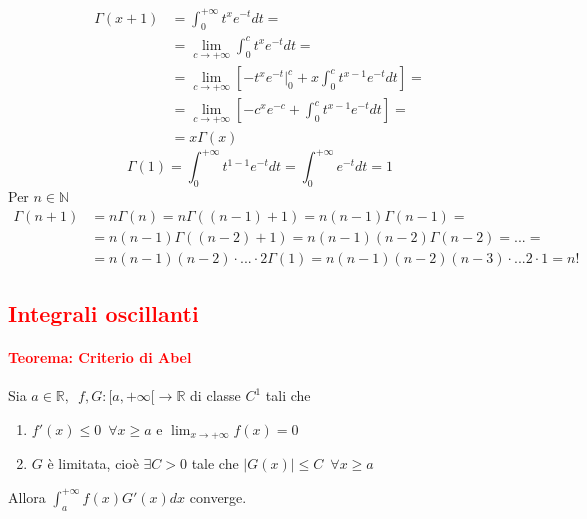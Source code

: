 \documentclass{article}
\newcommand{\R}{\mathbb{R}}
\newcommand{\N}{\mathbb{N}}
\begin{document}
\begin{enumerate}
\begin{align*}
        \Gamma(x+1)&=\int_{0}^{+\infty}t^{x}e^{-t}dt=\\
        &= \lim_{c\rightarrow+\infty} \int_{0}^{c}t^{x}e^{-t}dt=\\
        &= \lim_{c\rightarrow+\infty}\left[ -t^xe^{-t}|_{0}^c +x\int_{0}^{c}t^{x-1}e^{-t}dt\right]=\\
        &=\lim_{c\rightarrow+\infty}\left[ -c^x e^{-c} + \int_{0}^{c}t^{x-1}e^{-t}dt \right]=\\
        &=x\Gamma(x)
    \end{align*}
    \begin{equation*}
        \Gamma(1)=\int_{0}^{+\infty}t^{1-1}e^{-t}dt=\int_{0}^{+\infty}e^{-t}dt=1
    \end{equation*}
    Per $n \in \N$
    \begin{align*}
        \Gamma(n+1)&=n\Gamma(n)=n\Gamma((n-1)+1)=n(n-1)\Gamma(n-1) =\\
        &=n(n-1)\Gamma((n-2)+1)=n(n-1)(n-2)\Gamma(n-2) =...=\\
        &=n(n-1)(n-2)\cdot...\cdot2\Gamma(1) = n(n-1)(n-2)(n-3)\cdot...2\cdot1 = n!    
    \end{align*}
\end{enumerate}

\subsection{\textcolor{red}{Integrali oscillanti}}
\paragraph{\textcolor{red}{Teorema: Criterio di Abel}}
Sia $a\in\R,\,\,\,f,G:[a,+\infty[\rightarrow\R$ di classe $C^1$ tali che
\begin{enumerate}
    \item $f'(x)\leq 0 \,\,\, \forall x \geq a$ e $\lim_{x \rightarrow +\infty} f(x)=0$
    \item $G$ è limitata, cioè $\exists C > 0 $ tale che $ |G(x)|\leq C \,\,\, \forall x \geq a$
\end{enumerate}
Allora $\int_{a}^{+\infty}f(x)G'(x)dx$ converge.
\end{document}
